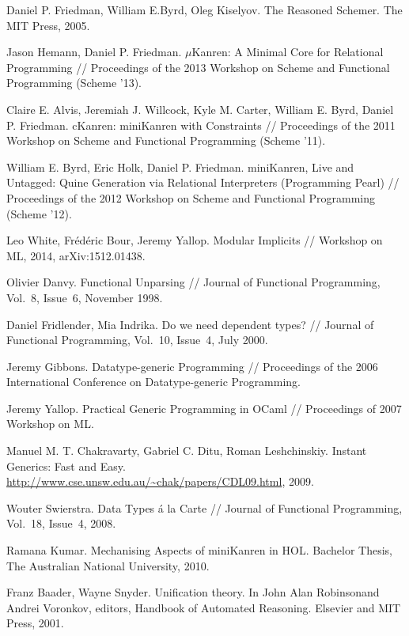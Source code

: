 \documentclass[submission,copyright,creativecommons]{eptcs}
\begin{document}
\begin{thebibliography}{99}
Daniel P. Friedman, William E.Byrd, Oleg Kiselyov. The Reasoned Schemer. The MIT
Press, 2005.

Jason Hemann, Daniel P. Friedman. $\mu$Kanren: A Minimal Core for Relational Programming //
Proceedings of the 2013 Workshop on Scheme and Functional Programming (Scheme '13).

Claire E. Alvis, Jeremiah J. Willcock, Kyle M. Carter, William E. Byrd, Daniel P. Friedman.
cKanren: miniKanren with Constraints // 
Proceedings of the 2011 Workshop on Scheme and Functional Programming (Scheme '11).

William E. Byrd, Eric Holk, Daniel P. Friedman.
miniKanren, Live and Untagged: Quine Generation via Relational Interpreters (Programming Pearl) //
Proceedings of the 2012 Workshop on Scheme and Functional Programming (Scheme '12).

Leo White, Fr\'ed\'eric Bour, Jeremy Yallop. 
Modular Implicits // Workshop on ML, 2014, arXiv:1512.01438.

Olivier Danvy.
Functional Unparsing // Journal of Functional Programming, Vol.~8, Issue~6, November 1998.

Daniel Fridlender, Mia Indrika.
Do we need dependent types? // Journal of Functional Programming, Vol.~10, Issue~4, July 2000.

Jeremy Gibbons. Datatype-generic Programming //
Proceedings of the 2006 International Conference on Datatype-generic Programming.

Jeremy Yallop. 
Practical Generic Programming in OCaml // Proceedings of 2007 Workshop on ML.

Manuel M. T. Chakravarty, Gabriel C. Ditu, Roman Leshchinskiy. 
Instant Generics: Fast and Easy. \url{http://www.cse.unsw.edu.au/~chak/papers/CDL09.html}, 2009.

Wouter Swierstra. Data Types \'a la Carte  // Journal of Functional Programming, Vol.~18, Issue~4, 2008.

Ramana Kumar. Mechanising Aspects of miniKanren in HOL. Bachelor Thesis, The Australian National University, 2010.

Franz Baader, Wayne Snyder. Uniﬁcation theory. In John Alan Robinsonand Andrei Voronkov, editors, 
Handbook of Automated Reasoning. Elsevier and MIT Press, 2001.


\end{thebibliography}
\end{document}
